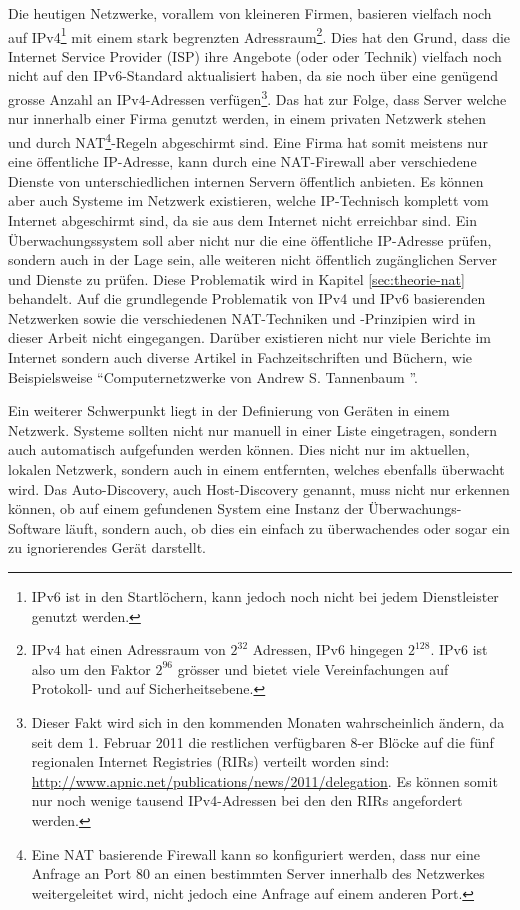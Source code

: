 
Die heutigen Netzwerke, vorallem von kleineren Firmen, basieren vielfach noch auf IPv4\footnote{\label{foot:theorie-ipv4}IPv6 ist in den Startl\"ochern, kann jedoch noch nicht bei jedem Dienstleister genutzt werden.} mit einem stark begrenzten Adressraum\footnote{\label{fot:theorie-piv4-numbers}IPv4 hat einen Adressraum von $2^{32}$ Adressen, IPv6 hingegen $2^{128}$. IPv6 ist also um den Faktor $2^{96}$ gr\"osser und bietet viele Vereinfachungen auf Protokoll- und auf Sicherheitsebene.}. Dies hat den Grund, dass die Internet Service Provider (ISP) ihre Angebote (oder oder Technik) vielfach noch nicht auf den IPv6-Standard aktualisiert haben, da sie noch \"uber eine gen\"ugend grosse Anzahl an IPv4-Adressen verf\"ugen\footnote{Dieser Fakt wird sich in den kommenden Monaten wahrscheinlich \"andern, da seit dem 1. Februar 2011 die restlichen verf\"ugbaren \/8-er Bl\"ocke auf die f\"unf regionalen Internet Registries (RIRs) verteilt worden sind: \url{http://www.apnic.net/publications/news/2011/delegation}. Es k\"onnen somit nur noch wenige tausend IPv4-Adressen bei den den RIRs angefordert werden.}. Das hat zur Folge, dass Server welche nur innerhalb einer Firma genutzt werden, in einem privaten Netzwerk stehen und durch NAT\footnote{\label{foot:theorie-nat}Eine NAT basierende Firewall kann so konfiguriert werden, dass nur eine Anfrage an Port 80 an einen bestimmten Server innerhalb des Netzwerkes weitergeleitet wird, nicht jedoch eine Anfrage auf einem anderen Port.}-Regeln abgeschirmt sind. Eine Firma hat somit meistens nur eine \"offentliche IP-Adresse, kann durch eine NAT-Firewall aber verschiedene Dienste von unterschiedlichen internen Servern \"offentlich anbieten. Es k\"onnen aber auch Systeme im Netzwerk existieren, welche IP-Technisch komplett vom Internet abgeschirmt sind, da sie aus dem Internet nicht erreichbar sind. Ein \"Uberwachungssystem soll aber nicht nur die eine \"offentliche IP-Adresse pr\"ufen, sondern auch in der Lage sein, alle weiteren nicht \"offentlich zug\"anglichen Server und Dienste zu pr\"ufen. Diese Problematik wird in Kapitel \ref{sec:theorie-nat} behandelt. Auf die grundlegende Problematik von IPv4 und IPv6 basierenden Netzwerken sowie die verschiedenen NAT-Techniken und -Prinzipien wird in dieser Arbeit nicht eingegangen. Dar\"uber existieren nicht nur viele Berichte im Internet sondern auch diverse Artikel in Fachzeitschriften und B\"uchern, wie Beispielsweise "`Computernetzwerke von Andrew S. Tannenbaum \cite{tannenbaum}"'.

Ein weiterer Schwerpunkt liegt in der Definierung von Ger\"aten in einem Netzwerk. Systeme sollten nicht nur manuell in einer Liste eingetragen, sondern auch automatisch aufgefunden werden k\"onnen. Dies nicht nur im aktuellen, lokalen Netzwerk, sondern auch in einem entfernten, welches ebenfalls \"uberwacht wird. Das Auto-Discovery, auch Host-Discovery genannt, muss nicht nur erkennen k\"onnen, ob auf einem gefundenen System eine Instanz der \"Uberwachungs-Software l\"auft, sondern auch, ob dies ein einfach zu \"uberwachendes oder sogar ein zu ignorierendes Ger\"at darstellt.


